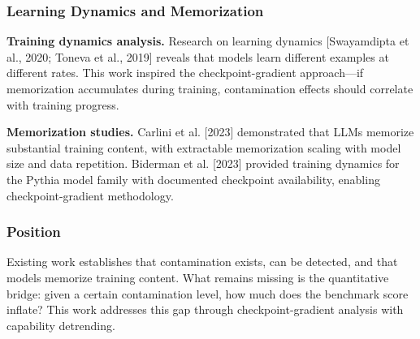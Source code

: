 \subsubsection{Learning Dynamics and Memorization}

\textbf{Training dynamics analysis.} Research on learning dynamics [Swayamdipta et al., 2020; Toneva et al., 2019] reveals that models learn different examples at different rates. This work inspired the checkpoint-gradient approach---if memorization accumulates during training, contamination effects should correlate with training progress.

\textbf{Memorization studies.} Carlini et al. [2023] demonstrated that LLMs memorize substantial training content, with extractable memorization scaling with model size and data repetition. Biderman et al. [2023] provided training dynamics for the Pythia model family with documented checkpoint availability, enabling checkpoint-gradient methodology.

\subsubsection{Position}

Existing work establishes that contamination exists, can be detected, and that models memorize training content. What remains missing is the quantitative bridge: given a certain contamination level, how much does the benchmark score inflate? This work addresses this gap through checkpoint-gradient analysis with capability detrending.

